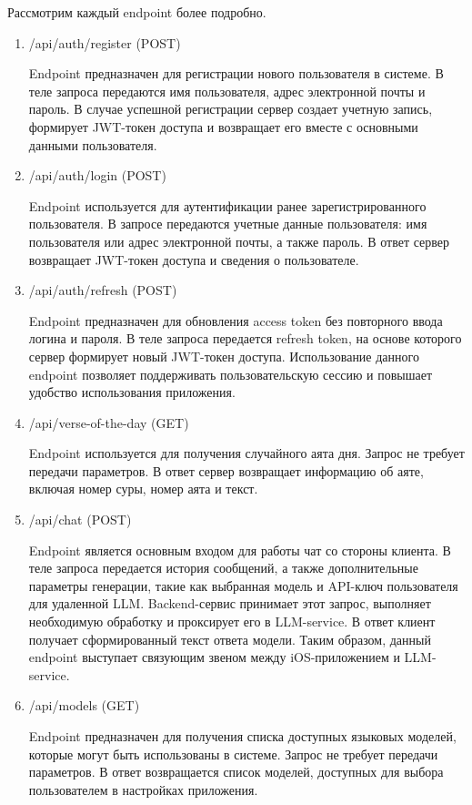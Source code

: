 Рассмотрим каждый endpoint более подробно.

\begin{enumerate}
	\item /api/auth/register (POST)

	Endpoint предназначен для регистрации нового пользователя в системе. В теле запроса передаются имя пользователя, адрес электронной почты и пароль. В случае успешной регистрации сервер создает учетную запись, формирует JWT-токен доступа и возвращает его вместе с основными данными пользователя.

	\item /api/auth/login (POST)

	Endpoint используется для аутентификации ранее зарегистрированного пользователя. В запросе передаются учетные данные пользователя: имя пользователя или адрес электронной почты, а также пароль. В ответ сервер возвращает JWT-токен доступа и сведения о пользователе.

	\item /api/auth/refresh (POST)

	Endpoint предназначен для обновления access token без повторного ввода логина и пароля. В теле запроса передается refresh token, на основе которого сервер формирует новый JWT-токен доступа. Использование данного endpoint позволяет поддерживать пользовательскую сессию и повышает удобство использования приложения.

	\item /api/verse-of-the-day (GET)

	Endpoint используется для получения случайного аята дня. Запрос не требует передачи параметров. В ответ сервер возвращает информацию об аяте, включая номер суры, номер аята и текст.

	\item /api/chat (POST)

	Endpoint является основным входом для работы чат со стороны клиента. В теле запроса передается история сообщений, а также дополнительные параметры генерации, такие как выбранная модель и API-ключ пользователя для удаленной LLM. Backend-сервис принимает этот запрос, выполняет необходимую обработку и проксирует его в LLM-service. В ответ клиент получает сформированный текст ответа модели. Таким образом, данный endpoint выступает связующим звеном между iOS-приложением и LLM-service.

	\item /api/models (GET)

	Endpoint предназначен для получения списка доступных языковых моделей, которые могут быть использованы в системе. Запрос не требует передачи параметров. В ответ возвращается список моделей, доступных для выбора пользователем в настройках приложения.


\end{enumerate}
